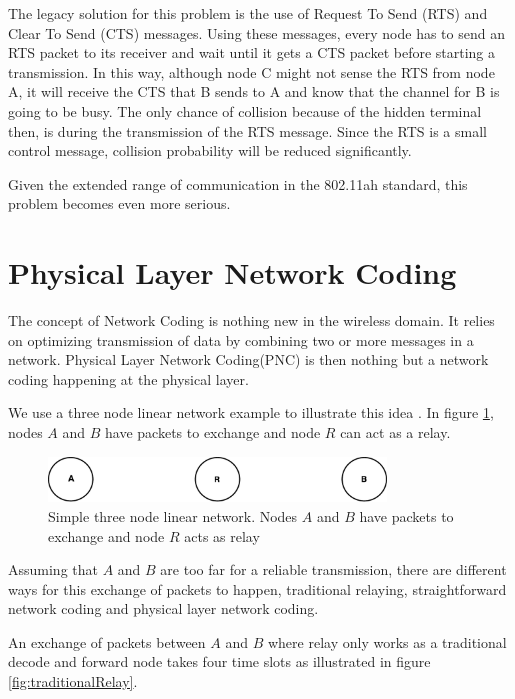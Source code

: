 The legacy solution for this problem is the use of Request To Send (RTS) and Clear To Send (CTS) messages. Using these messages, every node has to send an RTS packet to its receiver and wait until it gets a CTS packet before starting a transmission. In this way, although node C might not sense the RTS from node A, it will receive the CTS that B sends to A and know that the channel for B is going to be busy. The only chance of collision because of the hidden terminal then, is during the transmission of the RTS message. Since the RTS is a small control message, collision probability will be reduced significantly. 

Given the extended range of communication in the 802.11ah standard, this problem becomes even more serious.  



\section{Physical Layer Network Coding}

The concept of Network Coding is nothing new in the wireless domain. It relies on optimizing transmission of data by combining two or more messages in a network. Physical Layer Network Coding(PNC) is then nothing but a network coding happening at the physical layer.

We use a three node linear network example to illustrate this idea \cite{zhang2006hot}. In figure \ref{fig:justThreeNodes}, nodes $A$ and $B$ have packets to exchange and node $R$ can act as a relay.


\begin{figure}
    \centering
    \includegraphics[width=0.8\textwidth]{figures/justThreeNodes.pdf}
    \caption{Simple three node linear network. Nodes $A$ and $B$ have packets to exchange and node $R$ acts as relay} \label{fig:justThreeNodes}
\end{figure}

Assuming that $A$ and $B$ are too far for a reliable transmission, there are different ways for this exchange of packets to happen, traditional relaying, straightforward network coding and physical layer network coding.

An exchange of packets between $A$ and $B$ where relay only works as a traditional decode and forward node takes four time slots as illustrated in figure \ref{fig:traditionalRelay}.  

